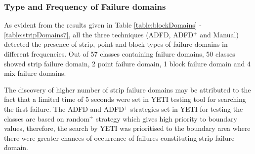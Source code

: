 



\subsubsection{Type and Frequency of Failure domains}
As evident from the results given in Table \ref{table:blockDomains} - \ref{table:stripDomains7}, all the three techniques (ADFD, ADFD$^+$ and Manual) detected the presence of strip, point and block types of failure domains in different frequencies. Out of 57 classes containing failure domains, 50 classes showed strip failure domain, 2 point failure domain, 1 block failure domain and 4 mix failure domains.  

The discovery of higher number of strip failure domains may be attributed to the fact that a limited time of 5 seconds were set in YETI testing tool for searching the first failure. The ADFD and ADFD$^+$ strategies set in YETI for testing the classes are based on random$^+$ strategy which gives high priority to boundary values, therefore, the search by YETI was prioritised to the boundary area where there were greater chances of occurrence of failures constituting strip failure domain.


